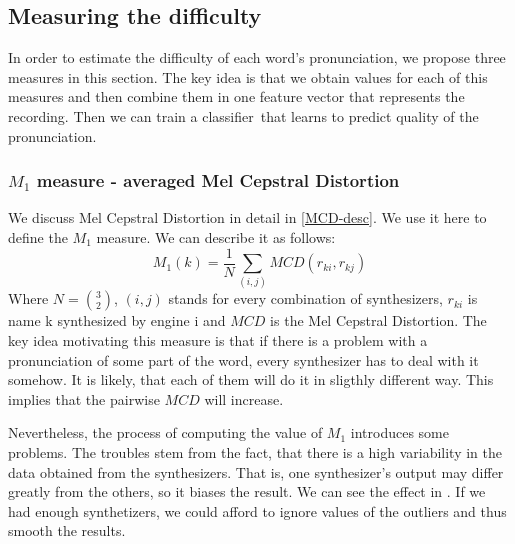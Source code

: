 \subsection{Measuring the difficulty}
In order to estimate the difficulty of each word's pronunciation, we propose three measures in this section. The key idea is that we obtain values for each of this measures and then combine them in one feature vector that represents the recording.
Then we can train a classifier\ that learns to predict quality of the pronunciation.
\subsubsection{$M_1$ measure - averaged Mel Cepstral Distortion}
We discuss Mel Cepstral Distortion in detail in \ref{MCD-desc}. We use it here to define the $M_1$ measure. We can describe it as follows:
\begin{equation}
M_1(k) = \frac{1}{N}\sum_{(i,j)}{MCD(r_{ki},r_{kj})}
\end{equation}
Where $N = {3\choose2}$, $(i,j)$ stands for every combination of synthesizers, $r_{ki}$ is name {k} synthesized by engine {i} and $MCD$ is the Mel Cepstral Distortion.
The key idea motivating this measure is that if there is a problem with a pronunciation of some part of the word, every synthesizer has to deal with it somehow. It is likely, that each of them will do it in sligthly different way. This implies that the pairwise $MCD$ will increase.
\par
Nevertheless, the process of computing the value of $M_1$ introduces some problems. The troubles stem from the fact, that there is a high variability in the data obtained from the synthesizers. That is, one synthesizer's output may differ greatly from the others, so it biases the result. We can see the effect in . If we had enough synthetizers, we could afford to ignore values of the outliers and thus smooth the results.
